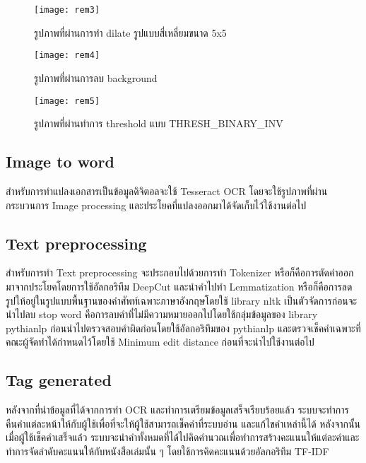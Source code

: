 \begin{figure}[H]
    \centering
    \texttt{[image: rem3]}
    \caption{รูปภาพที่ผ่านการทำ dilate รูปแบบสี่เหลี่ยมขนาด 5x5}\label{fig:rem3}
\end{figure}

\begin{figure}[H]
    \centering
    \texttt{[image: rem4]}
    \caption{รูปภาพที่ผ่านการลบ background}\label{fig:rem4}
\end{figure}

\begin{figure}[H]
    \centering
    \texttt{[image: rem5]}
    \caption{รูปภาพที่ผ่านทำการ threshold แบบ THRESH\_BINARY\_INV}\label{fig:rem5}
\end{figure}

\subsection{Image to word}

สำหรับการทำแปลงเอกสารเป็นข้อมูลดิจิตอลจะใช้ Tesseract OCR โดยจะใช้รูปภาพที่ผ่านกระบวนการ Image processing และประโยคที่แปลงออกมาได้จัดเก็บไว้ใช้งานต่อไป

\subsection{Text preprocessing}

สำหรับการทำ Text preprocessing จะประกอบไปด้วยการทำ Tokenizer หรือก็คือการตัดคำออกมาจากประโยคโดยการใช้อัลกอริทึม DeepCut และนำคำไปทำ Lemmatization หรือก็คือการลดรูปให้อยู่ในรูปแบบพื้นฐานของคำศัพท์เฉพาะภาษาอังกฤษโดยใช้ library nltk เป็นตัวจัดการก่อนจะนำไปลบ stop word คือการลบคำที่ไม่มีความหมายออกไปโดยใช้กลุ่มข้อมูลของ library pythianlp ก่อนนำไปตรวจสอบคำผิดก่อนโดยใช้อัลกอริทึมของ pythianlp และตรวจเช็คคำเฉพาะที่คณะผู้จัดทำได้กำหนดไว้โดยใช้ Minimum edit distance ก่อนที่จะนำไปใช้งานต่อไป

\subsection{Tag generated}

หลังจากที่นำข้อมูลที่ได้จากการทำ OCR และทำการเตรียมข้อมูลเสร็จเรียบร้อยแล้ว ระบบจะทำการคืนคำแต่ละหน้าให้กับผู้ใช้เพื่อที่จะให้ผู้ใช้สามารถเช็คคำที่ระบบอ่าน และแก้ไขคำเหล่านี้ได้ หลังจากนั้นเมื่อผู้ใช้เช็คคำเสร็จแล้ว ระบบจะนำคำทั้งหมดที่ได้ไปคิดคำนวณเพื่อทำการสร้างคะแนนให้แต่ละคำและทำการจัดลำดับคะแนนให้กับหนังสือเล่มนั้น ๆ โดยใช้การคิดคะแนนด้วยอัลกอริทึม TF-IDF 

